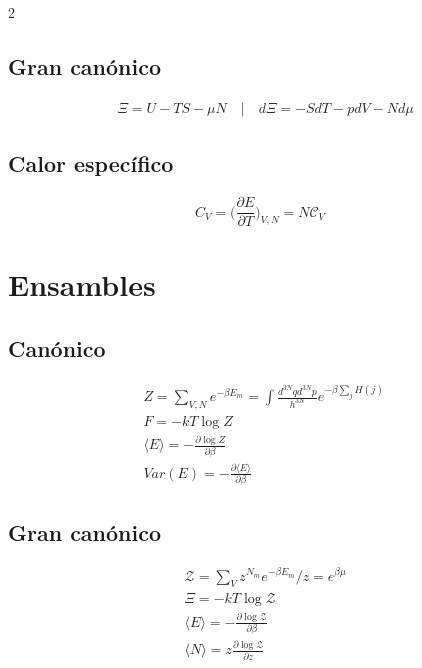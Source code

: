 \documentclass[a4, 12pt]{article}
\begin{document}
\begin{multicols}{2}
  \subsection*{Gran canónico}
  \begin{equation*}
    \begin{aligned}
      &\Xi = U -TS - \mu N \quad | \quad
      d\Xi = -SdT -pdV -Nd\mu
    \end{aligned}
  \end{equation*}

  \subsection*{Calor específico}
  \begin{equation*}
    C_{V} = \bigg( \frac{\partial E}{\partial T} \bigg)_{V,N} = N\mathcal{C}_V
  \end{equation*}

  \section*{Ensambles}

    \subsection*{Canónico}
  
    \begin{equation*}
        \begin{aligned}
          &Z = \sum_{{V,N}} e^{-\beta E_m}
          = \int \frac{d^{3N}q d^{3N}p}{h^{3N}} e^{-\beta \sum_{j} H(j)}\ \\
          &F = -kT\log{Z} \\
          &\langle E \rangle = - \frac{\partial \log{Z}}{\partial \beta} \\
          &Var(E) = - \frac{\partial \langle E \rangle}{\partial \beta}
        \end{aligned}
    \end{equation*}

    \subsection*{Gran canónico}
      \begin{equation*}
        \begin{aligned}
          &\mathcal{Z} = \sum_{{V}} z^{N_m} e^{-\beta E_m} \big/
          z = e^{\beta \mu} \\
          &\Xi = -kT\log{\mathcal{Z}} \\
          &\langle E \rangle = - \frac{\partial \log{\mathcal{Z}}}{\partial \beta} \\
          &\langle N \rangle = z \frac{\partial \log{\mathcal{Z}}}{\partial z}\\
        \end{aligned}
    \end{equation*}


\end{multicols}
\end{document}
